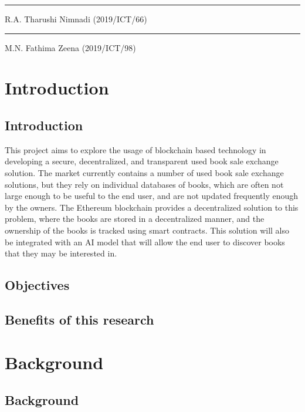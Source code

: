 \documentclass{article}
\begin{document}
\vspace{2cm} %
\rule{5cm}{0.5pt} %
\linebreak
R.A. Tharushi Nimnadi (2019/ICT/66)

\vspace{2cm} %
\rule{5cm}{0.5pt} %
\linebreak
M.N. Fathima Zeena (2019/ICT/98)

\newpage

\tableofcontents
\newpage

\section{Introduction}
\subsection{Introduction}
This project aims to explore the usage of blockchain based technology in developing
a secure, decentralized, and transparent used book sale exchange solution. The market
currently contains a number of used book sale exchange solutions, but they rely on
individual databases of books, which are often not large enough to be useful to the
end user, and are not updated frequently enough by the owners. The Ethereum blockchain
provides a decentralized solution to this problem, where the books are stored in a
decentralized manner, and the ownership of the books is tracked using smart contracts.
This solution will also be integrated with an AI model that will allow the end user to
discover books that they may be interested in.

\subsection{Objectives}


\subsection{Benefits of this research}


\section{Background}
\subsection{Background}
\end{document}
